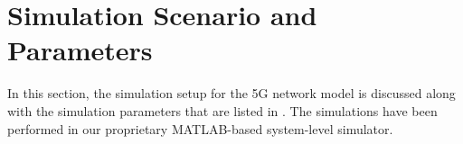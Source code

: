 \documentclass[10pt, conference]{IEEEtran}
\begin{document}

%
\section{Simulation Scenario and Parameters} \label{Section4}
In this section, the simulation setup for the 5G network model is discussed along with the simulation parameters that are listed in . The simulations have been performed in our proprietary MATLAB-based system-level simulator. 
\end{document}
